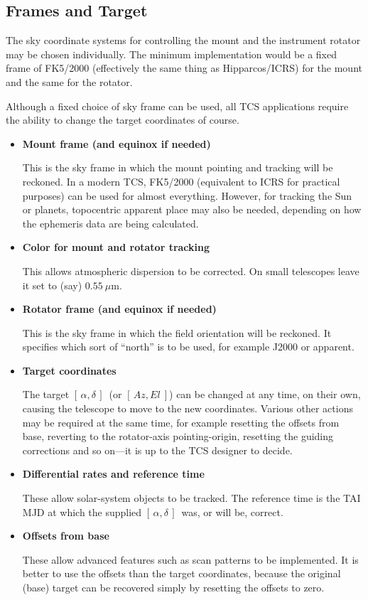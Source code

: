 \documentclass[12pt,fleqn,twoside]{article}
\renewcommand{\_}{{\tt\char'137}}     %
\newcommand{\radec}     {$[\,\alpha,\delta\,]$}
\newcommand{\azel}      {$[\,Az,El~]$}
\begin{document}
\subsection{Frames and Target}

The sky coordinate systems for controlling the mount and the
instrument rotator may be chosen individually.  The minimum
implementation would be a fixed frame of FK5/2000 (effectively the
same thing as Hipparcos/ICRS) for the mount and the same for the
rotator.

Although a fixed choice of sky frame can be used, all TCS
applications require the ability to change the target coordinates
of course.

\begin{itemize}

\item {\bf Mount frame (and equinox if needed)}

      This is the sky frame in which the mount pointing and tracking
      will be reckoned. In a modern TCS, FK5/2000 (equivalent to
      ICRS for practical purposes) can be used for
      almost everything.  However, for
      tracking the Sun or planets, topocentric apparent place may
      also be needed, depending on how the ephemeris
      data are being calculated.

\item {\bf Color for mount and rotator tracking}

      This allows atmospheric dispersion to be corrected.
      On small telescopes leave it set to (say)
      $0.55~\mu$m.

\item {\bf Rotator frame (and equinox if needed)}

      This is the sky frame in which the field orientation
      will be reckoned.  It specifies which sort of ``north''
      is to be used, for example J2000 or apparent.

\item {\bf Target coordinates}

      The target \radec\ (or \azel) can be changed at any
      time, on their own, causing the telescope to move
      to the new coordinates.  Various other actions may
      be required at the same time, for example resetting
      the offsets from base, reverting to the rotator-axis
      pointing-origin, resetting the guiding
      corrections and so on---it is up to the TCS designer
      to decide.

\item {\bf Differential rates and reference time}

      These allow solar-system objects to be tracked.  The
      reference time is the TAI MJD at which the supplied
      \radec\ was, or will be, correct.

\item {\bf Offsets from base}

      These allow advanced features such as scan patterns
      to be implemented.  It is better to use the offsets
      than the target coordinates, because the original
      (base) target can be recovered simply by resetting
      the offsets to zero.

\end{itemize}
\end{document}
